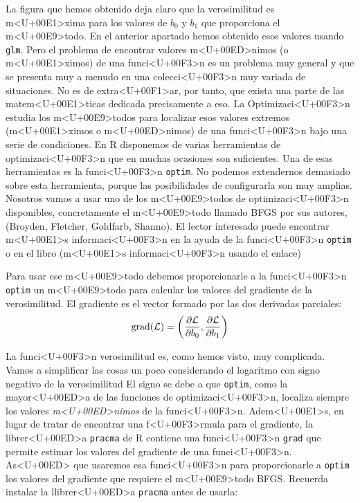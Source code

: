 \documentclass[10pt,a4paper]{article}
\newcounter {cont01}
\begin{document}
La figura que hemos obtenido deja claro que la verosimilitud es m<U+00E1>xima para los valores de $b_0$ y $b_1$ que proporciona el m<U+00E9>todo. En el anterior apartado hemos obtenido esos valores usando {\tt glm}. Pero el problema de encontrar valores m<U+00ED>nimos (o m<U+00E1>ximos) de una funci<U+00F3>n es un problema muy general y que se presenta muy a menudo en una colecci<U+00F3>n muy variada de situaciones. No es de extra<U+00F1>ar, por tanto, que exista una parte de las matem<U+00E1>ticas dedicada precisamente a eso. La {\sf Optimizaci<U+00F3>n} estudia los m<U+00E9>todos para localizar esos valores extremos (m<U+00E1>ximos o m<U+00ED>nimos) de una funci<U+00F3>n bajo una serie de condiciones. En R disponemos de varias herramientas de optimizaci<U+00F3>n que en muchas ocasiones son suficientes. Una de esas herramientas es la funci<U+00F3>n {\tt optim}. No podemos extendernos demasiado sobre esta herramienta, porque las posibilidades de configurarla son muy amplias. Nosotros vamos a usar uno de los m<U+00E9>todos de optimizaci<U+00F3>n disponibles, concretamente el m<U+00E9>todo llamado {\sf BFGS} por sus autores, (Broyden, Fletcher, Goldfarb, Shanno). El lector interesado puede encontrar m<U+00E1>s informaci<U+00F3>n en la ayuda de la funci<U+00F3>n {\tt optim} o en el libro (m<U+00E1>s informaci<U+00F3>n usando el enlace)
\begin{center}
\end{center}

Para usar ese m<U+00E9>todo debemos proporcionarle a la funci<U+00F3>n {\tt optim} un m<U+00E9>todo para calcular los valores del {\sf gradiente} de la verosimilitud. El gradiente es el vector formado por las dos derivadas parciales:
\[
\operatorname{grad}({\cal L}) = \left(
\dfrac{\partial {\cal L}}{\partial b_0}, \dfrac{\partial {\cal L}}{\partial b_1}
\right)
\]

La funci<U+00F3>n verosimilitud es, como hemos visto, muy complicada. Vamos a simplificar las cosas un poco considerando el logaritmo con signo negativo de la verosimilitud El signo se debe a que {\tt optim}, como la mayor<U+00ED>a de las funciones de optimizaci<U+00F3>n, localiza siempre los valores {\em m<U+00ED>nimos} de la funci<U+00F3>n. Adem<U+00E1>s, en lugar de tratar de encontrar una f<U+00F3>rmula para el gradiente, la librer<U+00ED>a {\tt pracma} de R contiene una funci<U+00F3>n {\tt grad} que permite estimar los valores del gradiente de una funci<U+00F3>n. As<U+00ED> que usaremos esa funci<U+00F3>n para proporcionarle a {\tt optim} los valores del gradiente que requiere el m<U+00E9>todo {\sf BFGS}. Recuerda instalar la llibrer<U+00ED>a {\tt pracma} antes de usarla:
\end{document}
